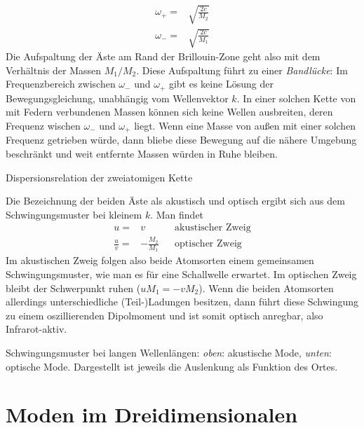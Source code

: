 \begin{align}
\omega_+ = & \sqrt{\frac{2 c}{M_2}} \\
\omega_- = & \sqrt{\frac{2 c}{M_1} }
\end{align}
Die Aufspaltung der Äste am Rand der Brillouin-Zone geht also mit dem Verhältnis der Massen $M_1 / M_2$. Diese Aufspaltung führt zu einer \emph{Bandlücke}: Im Frequenzbereich zwischen $\omega_- $ und $\omega_+$ gibt es keine Lösung der Bewegungsgleichung, unabhängig vom Wellenvektor $k$. In einer solchen Kette von mit Federn verbundenen Massen können sich keine Wellen ausbreiten, deren Frequenz wischen $\omega_- $ und $\omega_+$ liegt. Wenn eine Masse von außen mit einer solchen Frequenz getrieben würde, dann bliebe diese Bewegung auf die nähere Umgebung beschränkt und weit entfernte Massen würden in Ruhe bleiben.




\begin{marginfigure}

\caption{Dispersionsrelation der zweiatomigen Kette}
\end{marginfigure}

Die Bezeichnung der beiden Äste als akustisch und optisch ergibt sich aus dem Schwingungsmuster bei kleinem $k$. Man findet
\begin{align}
 u = &v &&  \text{akustischer Zweig} \\
  \frac{u}{v} = &- \frac{M_2}{M_1} &&  \text{optischer Zweig} 
\end{align}
Im akustischen Zweig folgen also beide Atomsorten einem gemeinsamen Schwingungsmuster, wie man es für eine Schallwelle erwartet. Im optischen Zweig bleibt der Schwerpunkt ruhen ($u M_1 = - v M_2$). Wenn die beiden Atomsorten allerdings unterschiedliche (Teil-)Ladungen besitzen, dann führt diese Schwingung zu einem oszillierenden Dipolmoment und ist somit optisch anregbar, also Infrarot-aktiv.


\begin{marginfigure}
\caption{Schwingungsmuster bei langen Wellenlängen: \textit{oben}: akustische Mode, \textit{unten}: optische Mode. Dargestellt ist jeweils die Auslenkung als Funktion des Ortes.}
\end{marginfigure}





\section{Moden im Dreidimensionalen}

